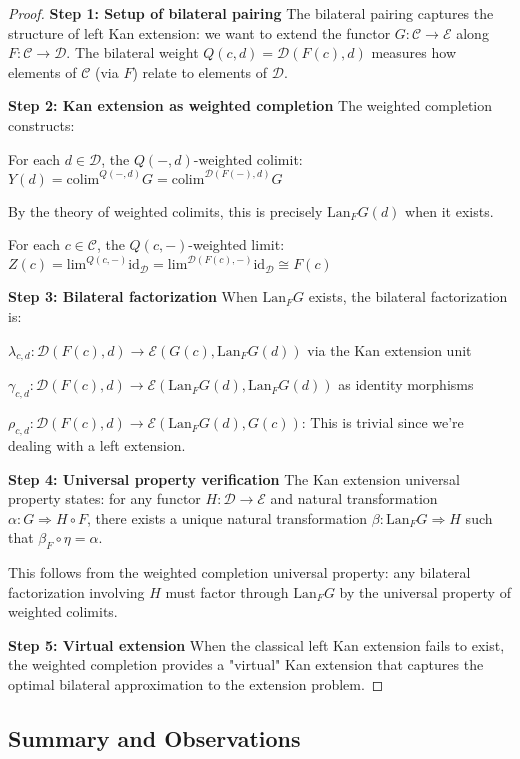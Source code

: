 \documentclass[11pt]{article}
\theoremstyle{plain}
\theoremstyle{definition}
\theoremstyle{remark}
\newcommand{\C}{\mathcal{C}}
\newcommand{\D}{\mathcal{D}}
\newcommand{\E}{\mathcal{E}}
\newcommand{\colim}{\mathrm{colim}}
\renewcommand{\lim}{\mathrm{lim}}
\begin{document}
\begin{proof}
\textbf{Step 1: Setup of bilateral pairing}
The bilateral pairing captures the structure of left Kan extension: we want to extend the functor $G : \C \to \E$ along $F : \C \to \D$. The bilateral weight $Q(c, d) = \D(F(c), d)$ measures how elements of $\C$ (via $F$) relate to elements of $\D$.

\textbf{Step 2: Kan extension as weighted completion}
The weighted completion constructs:

For each $d \in \D$, the $Q(-, d)$-weighted colimit:
$Y(d) = \colim^{Q(-, d)} G = \colim^{\D(F(-), d)} G$

By the theory of weighted colimits, this is precisely $\text{Lan}_F G(d)$ when it exists.

For each $c \in \C$, the $Q(c, -)$-weighted limit:
$Z(c) = \lim^{Q(c, -)} \text{id}_\D = \lim^{\D(F(c), -)} \text{id}_\D \cong F(c)$

\textbf{Step 3: Bilateral factorization}
When $\text{Lan}_F G$ exists, the bilateral factorization is:

$\lambda_{c,d} : \D(F(c), d) \to \E(G(c), \text{Lan}_F G(d))$ via the Kan extension unit

$\gamma_{c,d} : \D(F(c), d) \to \E(\text{Lan}_F G(d), \text{Lan}_F G(d))$ as identity morphisms

$\rho_{c,d} : \D(F(c), d) \to \E(\text{Lan}_F G(d), G(c))$: This is trivial since we're dealing with a left extension.

\textbf{Step 4: Universal property verification}
The Kan extension universal property states: for any functor $H : \D \to \E$ and natural transformation $\alpha : G \Rightarrow H \circ F$, there exists a unique natural transformation $\beta : \text{Lan}_F G \Rightarrow H$ such that $\beta_F \circ \eta = \alpha$.

This follows from the weighted completion universal property: any bilateral factorization involving $H$ must factor through $\text{Lan}_F G$ by the universal property of weighted colimits.

\textbf{Step 5: Virtual extension}
When the classical left Kan extension fails to exist, the weighted completion provides a "virtual" Kan extension that captures the optimal bilateral approximation to the extension problem.
\end{proof}

\subsection{Summary and Observations}
\end{document}
